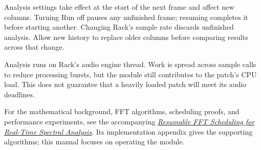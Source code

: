 \documentclass[12pt,letterpaper]{article}
\begin{document}
Analysis settings take effect at the start of the next frame and affect new
columns. Turning Run off pauses any unfinished frame; resuming completes it
before starting another. Changing Rack's sample rate discards unfinished
analysis. Allow new history to replace older columns before comparing results
across that change.

Analysis runs on Rack's audio engine thread. Work is spread across sample
calls to reduce processing bursts, but the module still contributes to the
patch's CPU load. This does not guarantee that a heavily loaded patch will
meet its audio deadlines.

For the mathematical background, FFT algorithms, scheduling proofs, and
performance experiments, see the accompanying
\href{https://github.com/Kautenja/ArhythmeticUnits-Fourier/tree/main/docs/whitepaper}{\textit{Resumable FFT Scheduling for Real-Time Spectral Analysis}}.
Its implementation appendix gives the supporting algorithms; this manual
focuses on operating the module.


\clearpage
\finalPage
\end{document}
